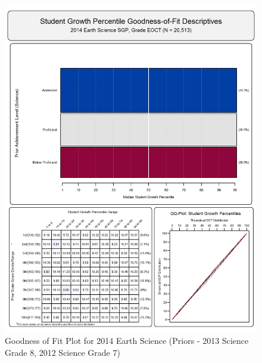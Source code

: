 \documentclass[12pt]{article}
\begin{document}
\begin{figure}[htbp]
\centering
\includegraphics{../img/Goodness_of_Fit/EARTH_SCIENCE.2014/2014_EARTH_SCIENCE_EOCT;2013_SCIENCE_8;2012_SCIENCE_7.png}
\caption{Goodness of Fit Plot for 2014 Earth Science (Priors - 2013
Science Grade 8, 2012 Science Grade 7)}
\end{figure}
\end{document}
